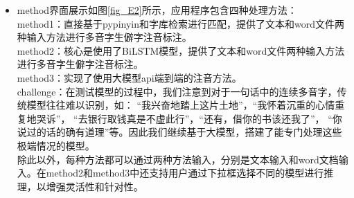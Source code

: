 \documentclass[12pt,hyperref,a4paper,UTF8]{ctexart}
\begin{document}
\begin{itemize}
\begin{itemize}
        \item method界面展示如图\ref{fig_E2}所示，应用程序包含四种处理方法：\\
        method1：直接基于pypinyin和字库检索进行匹配，提供了文本和word文件两种输入方法进行多音字生僻字注音标注。\\
        method2：核心是使用了BiLSTM模型，提供了文本和word文件两种输入方法进行多音字生僻字注音标注。\\
        method3：实现了使用大模型api端到端的注音⽅法。\\
        challenge：在测试模型的过程中，我们注意到对于一句话中的连续多音字，传统模型往往难以识别，如： “我兴奋地踏上这片土地”，“我怀着沉重的心情重复地哭诉”， “去银行取钱真是不虚此行”，“还有，借你的书该还我了”， “你说过的话的确有道理”等。因此我们继续基于大模型，搭建了能专门处理这些极端情况的模型。\\
        除此以外，每种方法都可以通过两种方法输入，分别是文本输入和word文档输入。在method2和method3中还支持用户通过下拉框选择不同的模型进行推理，以增强灵活性和针对性。
        \begin{figure}[htbp]
            \centering
            \\

\end{figure}
\end{itemize}
\end{itemize}
\end{document}
